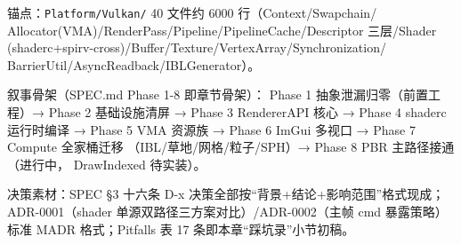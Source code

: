 锚点：\texttt{Platform/Vulkan/} 40 文件约 6000 行（Context/Swapchain/
Allocator(VMA)/RenderPass/Pipeline/PipelineCache/Descriptor 三层/Shader
(shaderc+spirv-cross)/Buffer/Texture/VertexArray/Synchronization/
BarrierUtil/AsyncReadback/IBLGenerator）。

叙事骨架（SPEC.md Phase 1-8 即章节骨架）：
Phase 1 抽象泄漏归零（前置工程）→ Phase 2 基础设施清屏 →
Phase 3 RendererAPI 核心 → Phase 4 shaderc 运行时编译 →
Phase 5 VMA 资源族 → Phase 6 ImGui 多视口 → Phase 7 Compute 全家桶迁移
（IBL/草地/网格/粒子/SPH）→ Phase 8 PBR 主路径接通（进行中，
DrawIndexed 待实装）。

决策素材：SPEC §3 十六条 D-x 决策全部按``背景+结论+影响范围''格式现成；
ADR-0001（shader 单源双路径三方案对比）/ADR-0002（主帧 cmd 暴露策略）
标准 MADR 格式；Pitfalls 表 17 条即本章``踩坑录''小节初稿。


